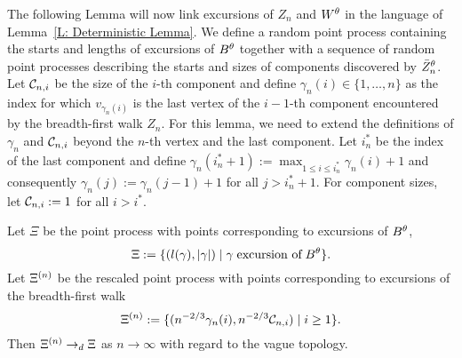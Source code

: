 The following Lemma will now link excursions of $Z_n$ and $W^{\theta}$ in the language of Lemma~\ref{L: Deterministic Lemma}.
We define a random point process containing the starts and lengths of excursions of $B^{\theta}$ together with a sequence of random point processes describing the starts and sizes of components discovered by $\bar{Z}^{\theta}_n$.
Let $\mathcal{C}_{n,i}$ be the size of the $i$-th component and
define $\gamma_n(i) \in \{1, \dots, n\}$ as the index for which
$v_{\gamma_n(i)}$ is the last vertex of the $i-1$-th component encountered by the breadth-first walk $Z_n$.
For this lemma, we need to extend the definitions of $\gamma_n$ and $\mathcal{C}_{n,i}$ beyond the $n$-th vertex and the last component.
Let $i^*_n$ be the index of the last component 
and define $\gamma_n(i^*_n + 1) := \max_{1 \leq i \leq i^*_n}\gamma_n(i) + 1$ 
and consequently $\gamma_n(j) := \gamma_n(j-1) + 1$ for all $j > i^*_n + 1$.
For component sizes, let $\mathcal{C}_{n,i} := 1$ for all $i > i^*$.


\begin{lemma} \label{L: Lemma 8}
	Let $\Xi$ be the point process with points corresponding to excursions of $B^{\theta}$,
	\begin{equation} \label{E: Lemma 8 def Xi}
	\Xi := \{ (l(\gamma), |\gamma|) \; | \; \gamma \; \text{excursion of} \; B^{\theta} \}.
	\end{equation}
	Let $\Xi^{(n)}$ be the rescaled point process with points corresponding to excursions of the breadth-first walk
	\begin{equation} \label{E: Lemma 8 def Xin}
	\Xi^{(n)} := \{ ( n^{-2 / 3} \gamma_n(i), n^{-2 / 3} \mathcal{C}_{n,i} ) \; | \; i \geq 1 \}.
	\end{equation}
	Then $\Xi^{(n)} \rightarrow_d \Xi$ as $n \rightarrow \infty$ with regard to the vague topology.
\end{lemma}


